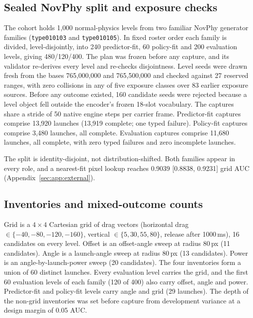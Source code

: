 \begin{revblock}
\subsection{Sealed NovPhy split and exposure checks}
\label{sec:app:proto:split}

The cohort holds 1,000 normal-physics levels from two familiar NovPhy generator families (\texttt{type010103} and \texttt{type010105}). In fixed roster order each family is divided, level-disjointly, into 240 predictor-fit, 60 policy-fit and 200 evaluation levels, giving 480/120/400. The plan was frozen before any capture, and its validator re-derives every level and re-checks disjointness. Level seeds were drawn fresh from the bases 765,000,000 and 765,500,000 and checked against 27 reserved ranges, with zero collisions in any of five exposure classes over 83 earlier exposure sources. Before any outcome existed, 160 candidate seeds were rejected because a level object fell outside the encoder's frozen 18-slot vocabulary. The captures share a stride of 50 native engine steps per carrier frame. Predictor-fit captures comprise 13,920 launches (13,919 complete; one typed failure). Policy-fit captures comprise 3,480 launches, all complete. Evaluation captures comprise 11,680 launches, all complete, with zero typed failures and zero incomplete launches.

The split is identity-disjoint, not distribution-shifted. Both families appear in every role, and a nearest-fit pixel lookup reaches 0.9039 [0.8838, 0.9231] grid AUC (Appendix~\ref{sec:app:external}).

\subsection{Inventories and mixed-outcome counts}

Grid is a $4\times4$ Cartesian grid of drag vectors (horizontal drag $\in\{-40,-80,-120,-160\}$, vertical $\in\{5,30,55,80\}$, release after 1000\,ms), 16 candidates on every level. Offset is an offset-angle sweep at radius 80\,px (11 candidates). Angle is a launch-angle sweep at radius 80\,px (13 candidates). Power is an angle-by-launch-power sweep (20 candidates). The four inventories form a union of 60 distinct launches. Every evaluation level carries the grid, and the first 60 evaluation levels of each family (120 of 400) also carry offset, angle and power. Predictor-fit and policy-fit levels carry angle and grid (29 launches). The depth of the non-grid inventories was set before capture from development variance at a design margin of 0.05 AUC.


\end{revblock}
